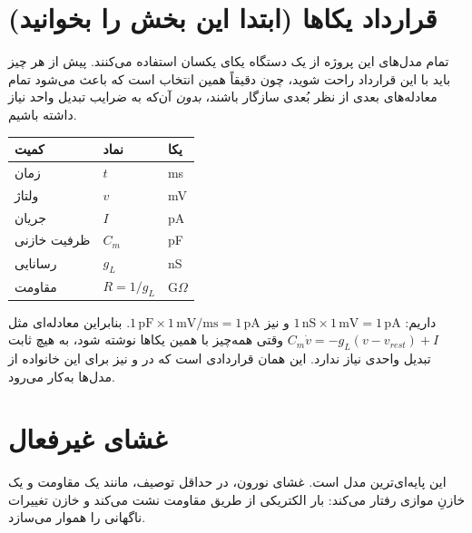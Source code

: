 \documentclass[11pt,a4paper]{article}
\begin{document}
	\vspace{0.2cm}
	
		\newpage
		
	\tableofcontents
	
	\newpage


\section{قرارداد یکاها (ابتدا این بخش را بخوانید)}
تمام مدل‌های این پروژه از یک دستگاه یکای یکسان استفاده می‌کنند. پیش از هر چیز باید با این قرارداد راحت شوید، چون دقیقاً همین انتخاب است که باعث می‌شود تمام معادله‌های بعدی از نظر بُعدی سازگار باشند، \emph{بدون} آن‌که به ضرایب تبدیل واحد نیاز داشته باشیم.

\begin{center}
	\begin{tabular}{@{}lll@{}}
		\toprule
		\textbf{کمیت} & \textbf{نماد} & \textbf{یکا} \\
		\midrule
		زمان & $t$ & ms \\
		ولتاژ & $v$ & mV \\
		جریان & $I$ & pA \\
		ظرفیت خازنی & $C_m$ & pF \\
		رسانایی & $g_L$ & nS \\
		مقاومت & $R = 1/g_L$ & G$\Omega$ \\
		\bottomrule
	\end{tabular}
\end{center}

\begin{keybox}
	داریم:
	$1\,\text{nS} \times 1\,\text{mV} = 1\,\text{pA}$
	و نیز
	$1\,\text{pF} \times 1\,\text{mV/ms} = 1\,\text{pA}$.
	بنابراین معادله‌ای مثل
	$C_m \dot v = -g_L(v-v_{rest}) + I$
	وقتی همه‌چیز با همین یکاها نوشته شود، به هیچ ثابت تبدیل واحدی نیاز ندارد. این همان قراردادی است که در  و  نیز برای این خانواده از مدل‌ها به‌کار می‌رود.
\end{keybox}

\section{غشای غیرفعال }
این پایه‌ای‌ترین مدل است. غشای نورون، در حداقل توصیف، مانند یک مقاومت و یک خازنِ موازی رفتار می‌کند: بار الکتریکی از طریق مقاومت نشت می‌کند و خازن تغییرات ناگهانی را هموار می‌سازد.
\end{document}
